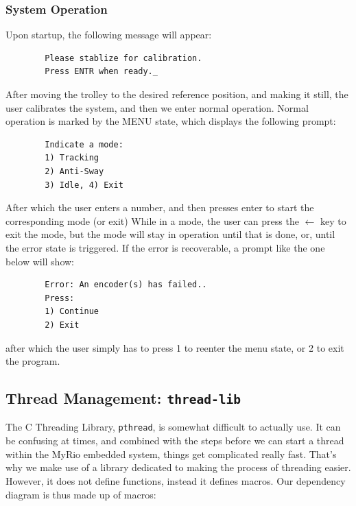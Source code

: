 \documentclass[letterpaper]{article}
\begin{document}
\subsubsection{System Operation}
Upon startup, the following message will appear:
\begin{center}
    \begin{lstlisting}
        Please stablize for calibration.
        Press ENTR when ready._
    \end{lstlisting}
\end{center}
After moving the trolley to the desired reference position, and making it still, the user calibrates the system, and then we enter normal operation. Normal operation is marked by the MENU state, which displays the following prompt:
\begin{center}
    \begin{lstlisting}
        Indicate a mode:
        1) Tracking
        2) Anti-Sway
        3) Idle, 4) Exit
    \end{lstlisting}
\end{center}
After which the user enters a number, and then presses enter to start the corresponding mode (or exit)
While in a mode, the user can press the $\leftarrow$ key to exit the mode, but the mode will stay in operation until that is done, or, until the error state is triggered. If the error is recoverable, a prompt like the one below will show:
\begin{lstlisting}
        Error: An encoder(s) has failed..
        Press:
        1) Continue
        2) Exit
\end{lstlisting}
after which the user simply has to press 1 to reenter the menu state, or 2 to exit the program.
\newpage

\subsection{Thread Management: \texttt{thread-lib}}

The C Threading Library, \texttt{pthread}, is somewhat difficult to actually use. It can be confusing at times, and combined with the steps before we can start a thread within the MyRio embedded system, things get complicated really fast. That's why we make use of a library dedicated to making the process of threading easier. However, it does not define functions, instead it defines macros. Our dependency diagram is thus made up of macros:
\end{document}
